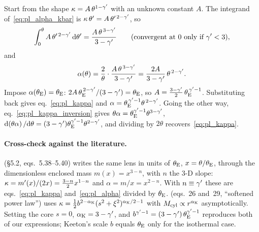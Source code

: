 \begin{derivation}
Start from the shape $\kappa = A\,\theta^{1-\gamma'}$ with an unknown
constant $A$.  The integrand of~\eqref{eq:pl_alpha_kbar} is
$\kappa\,\theta' = A\,\theta'^{\,2-\gamma'}$, so
\[
  \int_0^\theta A\,\theta'^{\,2-\gamma'}\,\dd\theta' = \frac{A\,\theta^{\,3-\gamma'}}{3-\gamma'}
  \qquad(\text{convergent at }0\text{ only if }\gamma'<3),
\]
and
\[
  \alpha(\theta) = \frac{2}{\theta}\cdot\frac{A\,\theta^{\,3-\gamma'}}{3-\gamma'}
                 = \frac{2A}{3-\gamma'}\,\theta^{\,2-\gamma'} .
\]
Impose $\alpha(\theta_{\mathrm{E}})=\theta_{\mathrm{E}}$:
$2A\,\theta_{\mathrm{E}}^{\,2-\gamma'}/(3-\gamma')=\theta_{\mathrm{E}}$, so
$A=\tfrac{3-\gamma'}{2}\,\theta_{\mathrm{E}}^{\,\gamma'-1}$.  Substituting back gives
eq.~\eqref{eq:pl_kappa} and $\alpha=\theta_{\mathrm{E}}^{\,\gamma'-1}\theta^{\,2-\gamma'}$.
Going the other way, eq.~\eqref{eq:pl_kappa_inversion} gives
$\theta\alpha=\theta_{\mathrm{E}}^{\gamma'-1}\theta^{3-\gamma'}$,
$\dd(\theta\alpha)/\dd\theta=(3-\gamma')\theta_{\mathrm{E}}^{\gamma'-1}\theta^{2-\gamma'}$, and
dividing by $2\theta$ recovers~\eqref{eq:pl_kappa}.
\end{derivation}

\paragraph{Cross-check against the literature.}
\citet{meneghetti_introduction_2021} (\S5.2, eqs.~5.38--5.40) writes the
same lens in units of $\theta_{\mathrm{E}}$, $x=\theta/\theta_{\mathrm{E}}$, through the
dimensionless enclosed mass $m(x)=x^{3-n}$, with $n$ the 3-D slope:
$\kappa=m'(x)/(2x)=\tfrac{3-n}{2}x^{1-n}$ and $\alpha=m/x=x^{2-n}$.
With $n\equiv\gamma'$ these are eqs.~\eqref{eq:pl_kappa}
and~\eqref{eq:pl_alpha} divided by $\theta_{\mathrm{E}}$.
\citet{keeton_2001_catalog} (eqs.~26 and~29, ``softened power law'')
uses $\kappa=\tfrac12 b^{2-\alpha_{\rm K}}(s^2+\xi^2)^{\alpha_{\rm K}/2-1}$
with $M_{\rm cyl}\propto r^{\alpha_{\rm K}}$ asymptotically.  Setting the
core $s=0$, $\alpha_{\rm K}=3-\gamma'$, and
$b^{\gamma'-1}=(3-\gamma')\,\theta_{\mathrm{E}}^{\gamma'-1}$ reproduces both of our
expressions; Keeton's scale $b$ equals $\theta_{\mathrm{E}}$ only for the
isothermal case.


